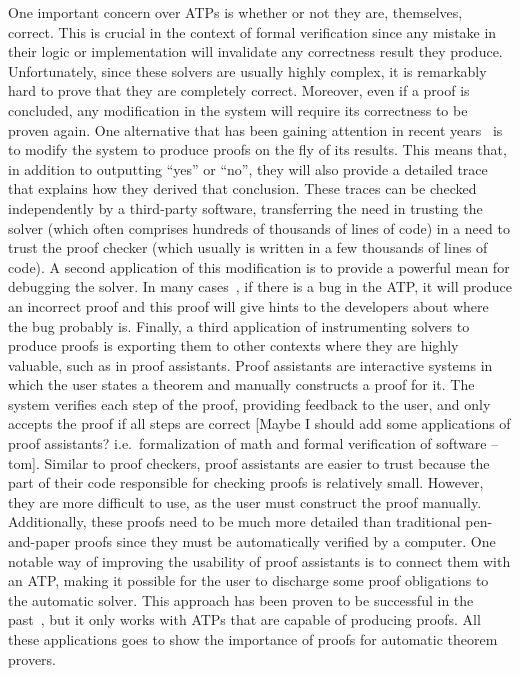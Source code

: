 \documentclass[a4paper, 12pt]{article}
\newcommand{\yell}[1]{{\color{blue} [#1]}}
\newcommand{\tom}[1]{\yell{#1 --tom}}
\begin{document}
One important concern over ATPs is whether or not they are, themselves, correct. This is crucial
in the context of formal verification since any mistake in their logic or implementation will invalidate any
correctness result they produce. Unfortunately, since these solvers are usually highly complex,
it is remarkably hard to prove that they are completely correct. Moreover, even if a proof is concluded,
any modification in the system will require its correctness to be proven again. One alternative that has been
gaining attention in recent years~\cite{generatingProofs, proofsInSmt} is to modify the system to produce
proofs on the fly of its results. This means that, in addition to outputting ``yes'' or ``no'', they will
also provide a detailed trace that explains how they derived that conclusion. These traces can be
checked independently by a third-party software, transferring the need in trusting the solver (which often
comprises hundreds of thousands of lines of code) in a need to trust the proof checker (which usually is
written in a few thousands of lines of code).
%
A second application of this modification is to provide a powerful mean for debugging the solver.
In many cases~\cite{generatingProofs}, if there is a bug in the ATP, it will produce an incorrect
proof and this proof will give hints to the developers about where the bug probably is.
%
Finally, a third application of instrumenting solvers to produce proofs is exporting them to
other contexts where they are highly valuable, such as in proof assistants.
%
Proof assistants are interactive systems in which the user states a theorem and manually constructs
a proof for it. The system verifies each step of the proof, providing feedback to the user, and only
accepts the proof if all steps are correct \tom{Maybe I should add some applications of proof assistants?
i.e.~formalization of math and formal verification of software}. Similar to proof checkers, proof
assistants are easier to trust because the part of their code responsible for checking proofs is
relatively small. However, they are more difficult to use, as the user must construct the proof
manually. Additionally, these proofs need to be much more detailed than traditional pen-and-paper proofs
since they must be automatically verified by a computer.
%
One notable way of improving the usability of proof assistants is to connect them with an ATP,
making it possible for the user to discharge some proof obligations to the automatic solver.
This approach has been proven to be successful in the past~\cite{coq2, reconstruct}, but it
only works with ATPs that are capable of producing proofs.
%
All these applications goes to show the importance of proofs for automatic theorem provers.
\end{document}
